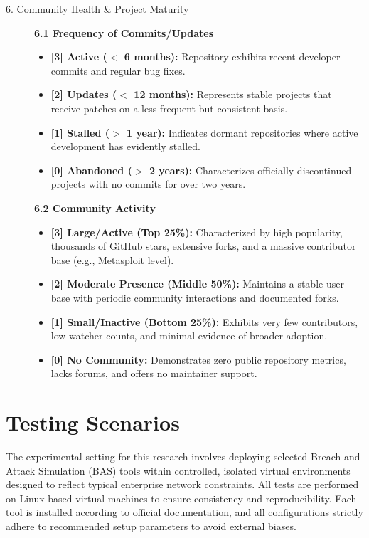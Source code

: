 \begin{description}
    \item[6. Community Health \& Project Maturity]  \hfill \par
    \textbf{6.1 Frequency of Commits/Updates}
    \begin{itemize}
        \item \textbf{[3] Active ($<$ 6 months):} Repository exhibits recent developer commits and regular bug fixes.
        \item \textbf{[2] Updates ($<$ 12 months):} Represents stable projects that receive patches on a less frequent but consistent basis.
        \item \textbf{[1] Stalled ($>$ 1 year):} Indicates dormant repositories where active development has evidently stalled.
        \item \textbf{[0] Abandoned ($>$ 2 years):} Characterizes officially discontinued projects with no commits for over two years.
    \end{itemize}
    \textbf{6.2 Community Activity}
    \begin{itemize}
        \item \textbf{[3] Large/Active (Top 25\%):} Characterized by high popularity, thousands of GitHub stars, extensive forks, and a massive contributor base (e.g., Metasploit level).
        \item \textbf{[2] Moderate Presence (Middle 50\%):} Maintains a stable user base with periodic community interactions and documented forks.
        \item \textbf{[1] Small/Inactive (Bottom 25\%):} Exhibits very few contributors, low watcher counts, and minimal evidence of broader adoption.
        \item \textbf{[0] No Community:} Demonstrates zero public repository metrics, lacks forums, and offers no maintainer support.
    \end{itemize}
\end{description}


\section{Testing Scenarios}\label{sec:Scenarios}

The experimental setting for this research involves deploying selected Breach and Attack Simulation (BAS) tools within controlled, isolated virtual environments designed to reflect typical enterprise network constraints. All tests are performed on Linux-based virtual machines to ensure consistency and reproducibility. Each tool is installed according to official documentation, and all configurations strictly adhere to recommended setup parameters to avoid external biases.

